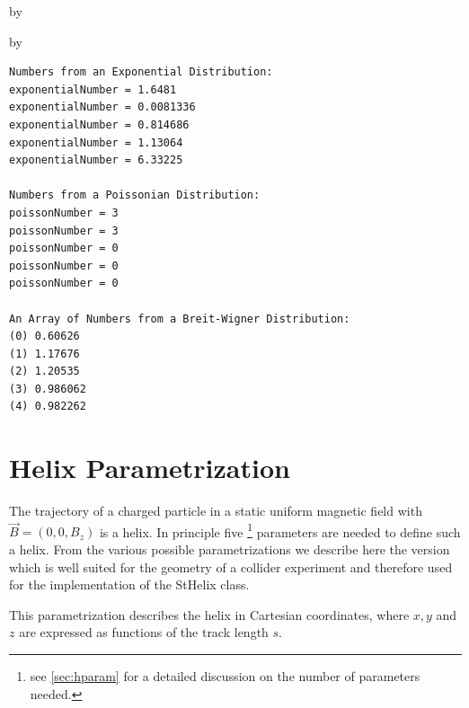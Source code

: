 \documentclass[twoside]{article}
\newcommand{\name}[1]{\textsf{#1}}%
\newcommand{\entrylabel}[1]{\mbox{\textbf{{#1}}}\hfil}%
\newenvironment{entry}
{\begin{list}{}%
    {\renewcommand{\makelabel}{\entrylabel}%
     \setlength{\labelwidth}{90pt}%
     \setlength{\leftmargin}{\labelwidth}
     \advance\leftmargin by \labelsep%
      }%
    }%
  {\end{list}}
\newcommand{\Entrylabel}[1]%
{\raisebox{0pt}[1ex][0pt]{\makebox[\labelwidth][l]%
    {\parbox[t]{\labelwidth}{\hspace{0pt}\textbf{{#1}}}}}}
\newenvironment{Entry}%
{\renewcommand{\entrylabel}{\Entrylabel}\begin{entry}}%
  {\end{entry}}
\begin{document}
\begin{description}
\begin{Entry}
\begin{Entry}
{\begin{verbatim}
Numbers from an Exponential Distribution:
exponentialNumber = 1.6481
exponentialNumber = 0.0081336
exponentialNumber = 0.814686
exponentialNumber = 1.13064
exponentialNumber = 6.33225

Numbers from a Poissonian Distribution:
poissonNumber = 3
poissonNumber = 3
poissonNumber = 0
poissonNumber = 0
poissonNumber = 0

An Array of Numbers from a Breit-Wigner Distribution:
(0) 0.60626
(1) 1.17676
(2) 1.20535
(3) 0.986062
(4) 0.982262
\end{verbatim}
} %

\end{Entry}
\clearpage

%
%

\appendix
\section{Helix Parametrization}
\label{app:helix}  
The trajectory of a charged particle in a static uniform magnetic
field with $\vec{B} = (0, 0, B_z)$ is a helix. In principle five
\footnote{see \ref{sec:hparam} for a detailed discussion on the number of parameters needed.}
parameters are needed to define such a helix. From the various
possible parametrizations we describe here the version which is well
suited for the geometry of a collider experiment and therefore used
for the implementation of the \name{StHelix} class. 

This parametrization describes the helix in Cartesian coordinates,
where $x, y$ and $z$ are expressed as functions of the track length
$s$.


\end{Entry}
\end{description}
\end{document}
